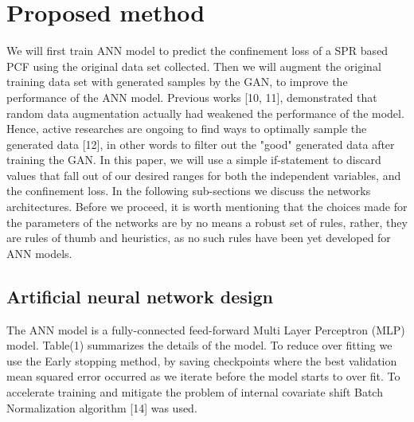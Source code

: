 \documentclass[draft, a4, 10pt, onecolumn]{IEEEtran}
\begin{document}
\section{Proposed method}
\label{sec:prop}

We will first train ANN model to predict the confinement loss of a SPR based PCF using the original data set collected. Then we will augment the original training data set with generated samples by the GAN, to improve the performance of the ANN model.
Previous works [10, 11], demonstrated that random data augmentation actually had weakened the performance of the model. Hence, active researches are ongoing to find ways to optimally sample the generated data [12], in other words to filter out the "good" generated data after training the GAN. In this paper, we will use a simple if-statement to discard values that fall out of our desired ranges for both the independent variables, and the confinement loss. In the following sub-sections we discuss the networks architectures. Before we proceed, it is worth mentioning that the choices made for the parameters of the networks are by no means a robust set of rules, rather, they are rules of thumb and heuristics, as no such rules have been yet developed for ANN models.

\subsection{Artificial neural network design}
\label{ssec:ann}
The ANN model is a fully-connected feed-forward Multi Layer Perceptron (MLP) model. Table(1) summarizes the details of the model. To reduce over fitting we use the Early stopping method, by saving checkpoints where the best validation mean squared error occurred as we iterate before the model starts to over fit. To accelerate training and mitigate the problem of internal covariate shift Batch Normalization algorithm [14] was used.

\begin{table}[h]
\centering
{}
\caption{Detailes of the ANN model}
\end{table}
\end{document}
